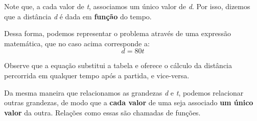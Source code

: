 Note que, a cada valor de \textit{t}, associamos um único valor de \textit{d}. Por isso, dizemos que a distância \textit{d} é dada em \textbf{função} do tempo. 

Dessa forma, podemos representar o problema através de uma expressão matemática, que no caso acima corresponde a: 
\begin{equation*}
  d = 80t
\end{equation*}

Observe que a equação substitui a tabela e oferece o cálculo da distância percorrida em qualquer tempo após a partida, e vice-versa. 

Da mesma maneira que relacionamos as grandezas \textit{d} e \textit{t}, podemos relacionar outras grandezas, de modo que a \textbf{cada valor} de uma seja associado \textbf{um único valor}
da outra. Relações como essas são chamadas de funções. 


